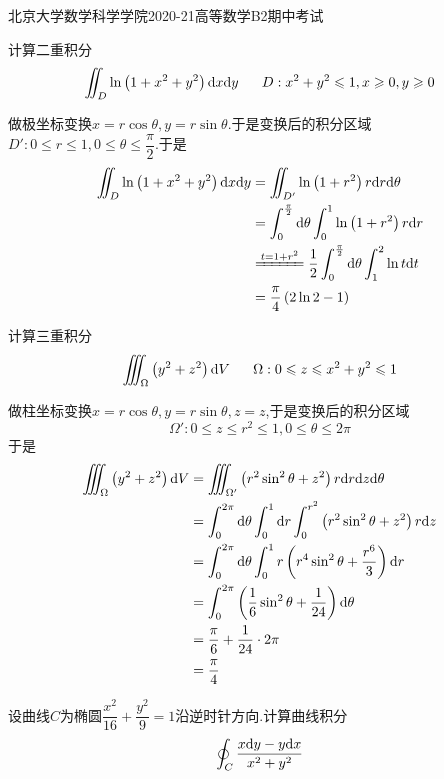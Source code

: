 \documentclass{ctexart}
\begin{document}
\pagestyle{empty}
\begin{center}\Large
    北京大学数学科学学院2020-21高等数学B2期中考试
\end{center}
\begin{problem}[1.(10\songti{分})]
    计算二重积分
    \[\iint_{D}\ln\left(1+x^2+y^2\right)\dx\di y\ \ \ \ \ D:x^2+y^2\leqslant1,x\geqslant0,y\geqslant0\]
\end{problem}
\begin{solution}
    做极坐标变换$x=r\cos\theta,y=r\sin\theta$.于是变换后的积分区域$D':0\leqslant r\leqslant 1,0\leqslant\theta\leqslant\dfrac\pi2$.于是
    \[\begin{aligned}
        \iint_{D}\ln\left(1+x^2+y^2\right)\dx\di y
        &= \iint_{D'}\ln\left(1+r^2\right)r\di r\di\theta \\
        &= \int_0^{\frac\pi2}\di\theta\int_0^1\ln\left(1+r^2\right)r\di r \\
        &\xlongequal{t=1+r^2} \dfrac12\int_0^{\frac\pi2}\di\theta\int_1^2\ln t\di t \\
        &= \dfrac\pi4\left(2\ln 2-1\right)
    \end{aligned}\]
\end{solution}
\begin{problem}[2.(10\songti{分})]
    计算三重积分
    \[\iiint_{\Omega}\left(y^2+z^2\right)\di V\ \ \ \ \ \Omega:0\leqslant z\leqslant x^2+y^2\leqslant1\]
\end{problem}
\begin{solution}
    做柱坐标变换$x=r\cos\theta,y=r\sin\theta,z=z$,于是变换后的积分区域
    \[\Omega':0\leqslant z\leqslant r^2\leqslant 1,0\leqslant \theta\leqslant 2\pi\]
    于是
    \[\begin{aligned}
        \iiint_{\Omega}\left(y^2+z^2\right)\mathrm{d} V
        &= \iiint_{\Omega'}\left(r^2\sin^2\theta+z^2\right)r\mathrm{d} r\mathrm{d} z\mathrm{d}\theta \\
        &= \int_0^{2\pi}\mathrm{d}\theta\int_0^1\mathrm{d} r\int_0^{r^2}\left(r^2\sin^2\theta+z^2\right)r\mathrm{d} z \\
        &= \int_0^{2\pi}\mathrm{d}\theta\int_0^1r\left(r^4\sin^2\theta+\dfrac{r^6}{3}\right)\mathrm{d} r\\
        &= \int_0^{2\pi}\left(\dfrac16\sin^2\theta+\dfrac1{24}\right)\mathrm{d}\theta\\
        &= \dfrac\pi6+\dfrac1{24}\cdot2\pi \\
        &= \dfrac\pi4
    \end{aligned}\]
\end{solution}
\begin{problem}[3.(10\songti{分})]
    设曲线$C$为椭圆$\dfrac{x^2}{16}+\dfrac{y^2}{9}=1$沿逆时针方向.计算曲线积分
    \[\oint_{C}\dfrac{x\mathrm{d} y-y\mathrm{d} x}{x^2+y^2}\]
\end{problem}
\end{document}
